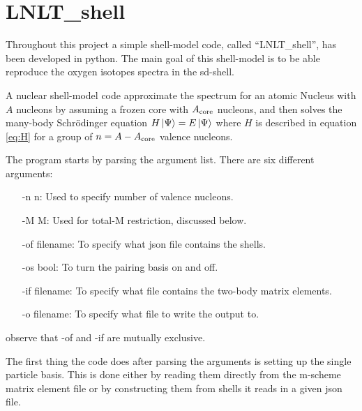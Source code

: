 \section{LNLT\_shell} \label{sec:CodeExpl}

Throughout this project a simple shell-model code, called ``LNLT\_shell'', has been developed in python. The main goal of this shell-model is to be able reproduce the oxygen isotopes spectra in the sd-shell.

A nuclear shell-model code approximate the spectrum for an atomic Nucleus with \(A\) nucleons by assuming a frozen core with \(A_{\rm{core}}\) nucleons, and then solves the many-body Schrödinger equation \(H\ket{\Psi}=E\ket{\Psi}\) where \(H\) is described in equation \ref{eq:H}
for a group of \(n=A-A_{\rm{core}}\) valence nucleons.



The program starts by parsing the argument list. There are six different arguments:
\begin{itemize}
\item[-n n:] Used to specify number of valence nucleons.
\item[-M M:] Used for total-M restriction, discussed below.
\item[-of filename:] To specify what json file contains the shells.
\item[-os bool:] To turn the pairing basis on and off.
\item[-if filename:] To specify what file contains the two-body matrix elements.
\item[-o filename:] To specify what file to write the output to.
\end{itemize}
observe that -of and -if are mutually exclusive.




The first thing the code does after parsing the arguments is setting up the single particle basis.
This is done either by reading them directly from the m-scheme matrix element file %
or by constructing them from shells it reads in a given json file.



